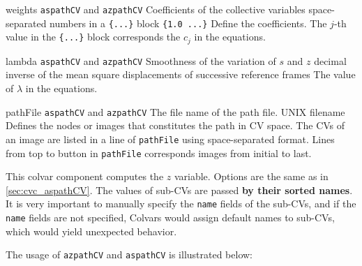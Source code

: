 \begin{cvcoptions}
\item %
  \keydef
    {weights}{%
    \texttt{aspathCV} and \texttt{azpathCV}}{%
    Coefficients of the collective variables}{%
    space-separated numbers in a \texttt{\{...\}} block}{%
    \texttt{\{1.0 ...\}}}{%
    Define the coefficients. The $j$-th value in the \texttt{\{...\}} block corresponds the $c_{j}$ in the equations.
  }

\item %
  \keydef
    {lambda}{%
    \texttt{aspathCV} and \texttt{azpathCV}}{%
    Smoothness of the variation of $s$ and $z$}{%
    decimal}{%
    inverse of the mean square displacements of successive reference frames}{%
    The value of $\lambda$ in the equations.
  }

\item %
  \key
    {pathFile}{%
    \texttt{aspathCV} and \texttt{azpathCV}}{%
    The file name of the path file.}{%
    UNIX filename}{%
		Defines the nodes or images that constitutes the path in CV space. The CVs of an image are listed in a line of \texttt{pathFile} using space-separated format. Lines from top to button in \texttt{pathFile} corresponds images from initial to last.
    }

\end{cvcoptions}


This colvar component computes the $z$ variable. Options are the same as in \ref{sec:cvc_aspathCV}. The values of sub-CVs are passed \textbf{by their sorted names}. It is very important to manually specify the \texttt{name} fields of the sub-CVs, and if the \texttt{name} fields are not specified, Colvars would assign default names to sub-CVs, which would yield unexpected behavior.

The usage of \texttt{azpathCV} and \texttt{aspathCV} is illustrated below:

